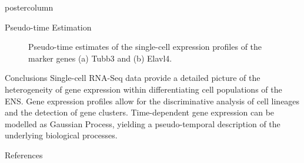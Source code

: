 \documentclass{beamer}
\begin{document}
\begin{frame}
\begin{columns}
\begin{column}{.45\textwidth}
\begin{beamercolorbox}[center]{postercolumn}
\begin{minipage}{.98\textwidth}
{\begin{myblock}{Pseudo-time Estimation}
\begin{figure}
\begin{minipage}{\textwidth}
	\caption{Pseudo-time estimates of the single-cell expression profiles
			of the marker genes (a) Tubb3 and (b) Elavl4.}
	\label{fig:pseudotime}
\end{minipage}
\end{figure}
\end{myblock}\vfill
\begin{myblock}{Conclusions}
Single-cell RNA-Seq data provide a detailed picture of the heterogeneity of
gene expression within differentiating cell populations of the ENS.
Gene expression profiles allow for the discriminative analysis of cell lineages
and the detection of gene clusters. Time-dependent gene expression can be modelled
as Gaussian Process, yielding a pseudo-temporal description of the underlying
biological processes.
\end{myblock}\vfill
\begin{myblock}{References}
\footnotesize


\end{myblock}\vfill
}\end{minipage}
\end{beamercolorbox}
\end{column}
\end{columns}
\end{frame}
\end{document}
